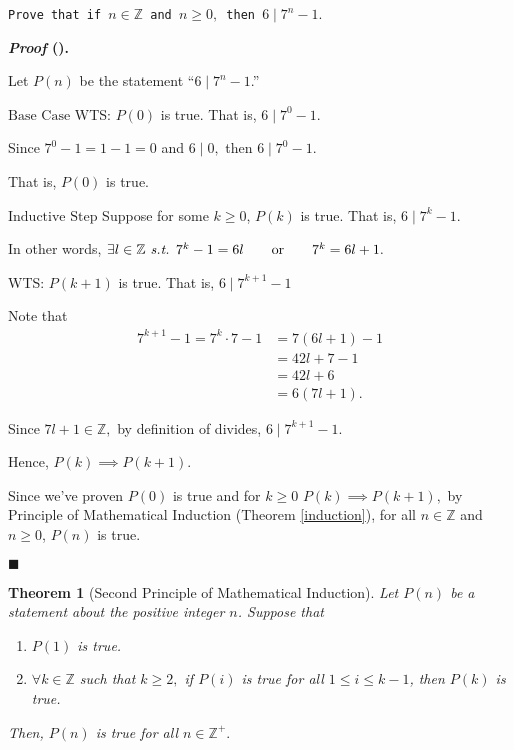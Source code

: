 \documentclass[12pt,a4paper]{article}
\newtheorem{thm}{Theorem}[subsection]
\newcounter{nprf}[subsection]
\newenvironment*{prf}{\par\indent\textbf{\textit{Proof} (\stepcounter{nprf}\thenprf). }\par }{\par\hfill $\blacksquare$\par}
\def\Z{{\mathbb{Z}}}
\def\Zp{{\Z^{+}}}
\def\st{\emph{ s.t. }}
\begin{document}
\begin{framed}
\noindent\texttt{Prove that if $n\in\Z$ and $n\geq0,$ then $6\mid7^n-1.$}
\begin{prf}
	Let $P(n)$ be the statement ``$6\mid7^n-1$.''\par$\boxed{\text{Base Case}}$ WTS: $P(0)$ is true. That is, $6\mid7^0-1.$\par\hspace{5mm} Since $7^0-1=1-1=0$ and $6\mid0,$ then $6\mid7^0-1.$\par\hspace{5mm} That is, $P(0)$ is true. \par$\boxed{\text{Inductive Step}}$ Suppose for some $k\geq0$, $P(k)$ is true. That is, $6\mid7^k-1. $\par\hspace{5mm} In other words, $\exists l\in\Z\st7^k-1=6l\qquad\text{or}\qquad7^k=6l+1.$\par\hspace{5mm} WTS: $P(k+1)$ is true. That is, $6\mid7^{k+1}-1$\par\hspace{5mm} Note that \[\begin{aligned}7^{k+1}-1=7^k\cdot7-1&=7(6l+1)-1\\&=42l+7-1\\&=42l+6\\&=6(7l+1).\end{aligned}\]\par\hspace{5mm} Since $7l+1\in\Z,$ by definition of divides, $6\mid7^{k+1}-1.$\par\hspace{5mm} Hence, $P(k)\implies P(k+1).$\par Since we've proven $P(0)$ is true and for $k\geq0$ $P(k)\implies P(k+1),$ by Principle of Mathematical Induction (Theorem \ref{induction}), for all $n\in\Z$ and $n\geq0$, $P(n)$ is true. 
\end{prf}
\end{framed}
\begin{thm}[Second Principle of Mathematical Induction]\label{stronginduction}
	Let $P(n)$ be a statement about the positive integer $n$. Suppose that \begin{enumerate}
		\item $P(1)$ is true.
		\item $\forall k\in\Z$ such that $k\geq2,$ if $P(i)$ is true for all $1\leq i\leq k-1$, then $P(k)$ is true.
	\end{enumerate}	
	Then, $P(n)$ is true for all $n\in\Zp.$
\end{thm}
\end{document}
